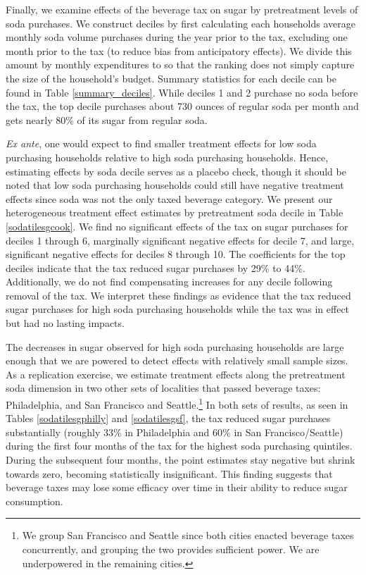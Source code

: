 \documentclass[12pt]{article}
\begin{document}
Finally, we examine effects of the beverage tax on sugar by pretreatment levels of soda purchases. We construct deciles by first calculating each households average monthly soda volume purchases during the year prior to the tax, excluding one month prior to the tax (to reduce bias from anticipatory effects). We divide this amount by monthly expenditures to so that the ranking does not simply capture the size of the household's budget. Summary statistics for each decile can be found in Table \ref{summary_deciles}. While deciles 1 and 2 purchase no soda before the tax, the top decile purchases about 730 ounces of regular soda per month and gets nearly 80\% of its sugar from regular soda.

\textit{Ex ante}, one would expect to find smaller treatment effects for low soda purchasing households relative to high soda purchasing households. Hence, estimating effects by soda decile serves as a placebo check, though it should be noted that low soda purchasing households could still have negative treatment effects since soda was not the only taxed beverage category. We present our heterogeneous treatment effect estimates by pretreatment soda decile in Table \ref{sodatilesgcook}. We find no significant effects of the tax on sugar purchases for deciles 1 through 6, marginally significant negative effects for decile 7, and large, significant negative effects for deciles 8 through 10. The coefficients for the top deciles indicate that the tax reduced sugar purchases by 29\% to 44\%. Additionally, we do not find compensating increases for any decile following removal of the tax. We interpret these findings as evidence that the tax reduced sugar purchases for high soda purchasing households while the tax was in effect but had no lasting impacts.

The decreases in sugar observed for high soda purchasing households are large enough that we are powered to detect effects with relatively small sample sizes. As a replication exercise, we estimate treatment effects along the pretreatment soda dimension in two other sets of localities that passed beverage taxes: Philadelphia, and San Francisco and Seattle.\footnote{We group San Francisco and Seattle since both cities enacted beverage taxes concurrently, and grouping the two provides sufficient power. We are underpowered in the remaining cities.} In both sets of results, as seen in Tables \ref{sodatilesgphilly} and \ref{sodatilesgsf}, the tax reduced sugar purchases substantially (roughly 33\% in Philadelphia and 60\% in San Francisco/Seattle) during the first four months of the tax for the highest soda purchasing quintiles. During the subsequent four months, the point estimates stay negative but shrink towards zero, becoming statistically insignificant. This finding suggests that beverage taxes may lose some efficacy over time in their ability to reduce sugar consumption.
\end{document}
